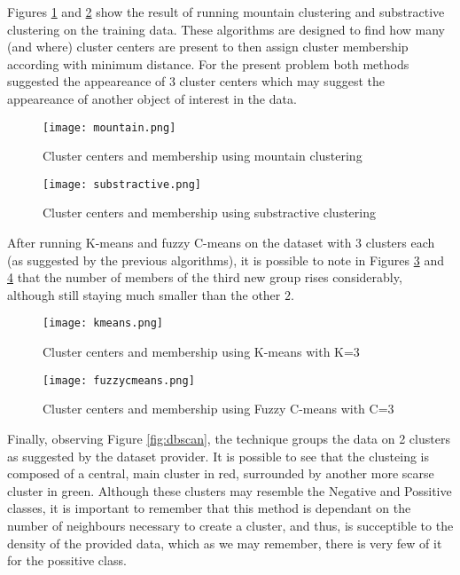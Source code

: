 Figures \ref{fig:mountain} and \ref{fig:substractive} show the result of running
mountain clustering and substractive clustering on the training data. These
algorithms are designed to find how many (and where) cluster centers are
present to then assign cluster membership according with minimum
distance. For the present problem both methods suggested the appeareance of 3
cluster centers which may suggest the appeareance of another object of interest
in the data.

\begin{figure}[t]
    \texttt{[image: mountain.png]}
    \caption{Cluster centers and membership using mountain clustering
    \label{fig:mountain}}
\end{figure}
\begin{figure}[t]
    \texttt{[image: substractive.png]}
    \caption{Cluster centers and membership using substractive clustering
    \label{fig:substractive}}
\end{figure}

After running K-means and fuzzy C-means on the dataset with $3$ clusters each
(as suggested by the previous algorithms), it is possible to note in Figures
\ref{fig:kmeans} and \ref{fig:fuzzycmeans} that the number of members of the
third new group rises considerably, although still staying much smaller than the
other $2$.

\begin{figure}[t]
    \texttt{[image: kmeans.png]}
    \caption{Cluster centers and membership using K-means with K=3
    \label{fig:kmeans}}
\end{figure}
\begin{figure}[t]
    \texttt{[image: fuzzycmeans.png]}
    \caption{Cluster centers and membership using Fuzzy C-means with C=3 
    \label{fig:fuzzycmeans}}
\end{figure}

Finally, observing Figure \ref{fig:dbscan}, the technique groups the data on 2
clusters as suggested by the dataset provider. It is possible to see that the
clusteing is composed of a central, main cluster in red, surrounded by another
more scarse cluster in green. Although these clusters may resemble the Negative
and Possitive classes, it is important to remember that this method is dependant
on the number of neighbours necessary to create a cluster, and thus, is
succeptible to the density of the provided data, which as we may remember, there
is very few of it for the possitive class.

